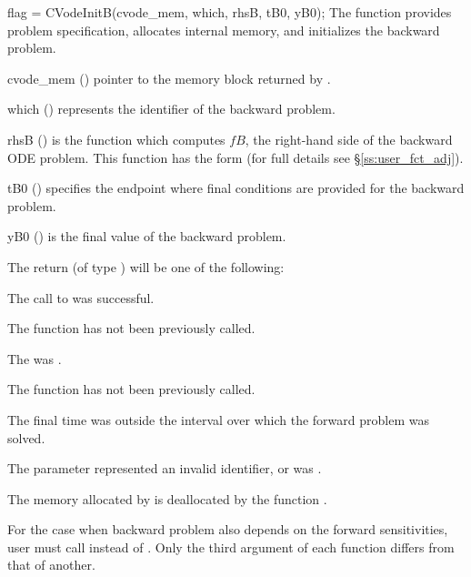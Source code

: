 {
  flag = CVodeInitB(cvode\_mem, which, rhsB, tB0, yB0);
}
{
  The function  provides problem specification, allocates internal memory, 
  and initializes the backward problem.
}
{
  \begin{args}
  \item[cvode\_mem] ()
    pointer to the {\cvodes} memory block returned by .
  \item[which] ()
    represents the identifier of the backward problem.
  \item[rhsB] ()
    is the {\C} function which computes $fB$, the right-hand side of the 
    backward ODE problem. This function has the form 
     (for full details see \S\ref{ss:user_fct_adj}).
  \item[tB0] ()
    specifies the endpoint where final conditions are provided for the 
    backward problem.
  \item[yB0] ()
    is the final value of the backward problem. 
  \end{args}
}
{
  The return  (of type ) will be one of the following:
  \begin{args}
  \item[\Id{CV\_SUCCESS}]
    The call to  was successful.
  \item[\Id{CV\_NO\_MALLOC}]
    The function  has not been previously called.
  \item[\Id{CV\_MEM\_NULL}]
    The  was .
  \item[\Id{CV\_NO\_ADJ}]
    The function  has not been previously called.
  \item[\Id{CV\_BAD\_TB0}]
    The final time  was outside the interval over which the forward problem
    was solved.
  \item[\Id{CV\_ILL\_INPUT}]
    The parameter  represented an invalid identifier, 
     or  was .
  \end{args}
}
{
  The memory allocated by  is deallocated by the function 
  .
}

For the case when backward problem also depends on the forward sensitivities, user
must call  instead of . Only the third argument of each function
differs from that of another.

